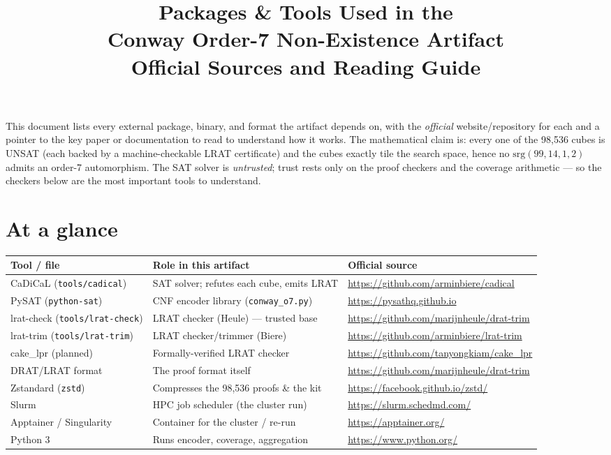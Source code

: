 \documentclass[11pt]{article}
\title{Packages \& Tools Used in the\\ Conway Order-7 Non-Existence Artifact\\[4pt]
\large Official Sources and Reading Guide}
\author{}
\date{}
\begin{document}
\maketitle

\noindent
This document lists every external package, binary, and format the artifact
depends on, with the \emph{official} website/repository for each and a pointer
to the key paper or documentation to read to understand how it works. The
mathematical claim is: every one of the 98{,}536 cubes is UNSAT (each backed by
a machine-checkable LRAT certificate) and the cubes exactly tile the search
space, hence no $\mathrm{srg}(99,14,1,2)$ admits an order-7 automorphism. The SAT
solver is \emph{untrusted}; trust rests only on the proof checkers and the
coverage arithmetic --- so the checkers below are the most important tools to
understand.

\section*{At a glance}
\noindent\begin{center}\small
\begin{tabular}{@{}p{} p{} p{}@{}}
\textbf{Tool / file} & \textbf{Role in this artifact} & \textbf{Official source} \\
\hline
CaDiCaL (\texttt{tools/cadical}) & SAT solver; refutes each cube, emits LRAT & \url{https://github.com/arminbiere/cadical} \\
PySAT (\texttt{python-sat}) & CNF encoder library (\texttt{conway\_o7.py}) & \url{https://pysathq.github.io} \\
lrat-check (\texttt{tools/lrat-check}) & LRAT checker (Heule) --- trusted base & \url{https://github.com/marijnheule/drat-trim} \\
lrat-trim (\texttt{tools/lrat-trim}) & LRAT checker/trimmer (Biere) & \url{https://github.com/arminbiere/lrat-trim} \\
cake\_lpr (planned) & Formally-verified LRAT checker & \url{https://github.com/tanyongkiam/cake_lpr} \\
DRAT/LRAT format & The proof format itself & \url{https://github.com/marijnheule/drat-trim} \\
Zstandard (\texttt{zstd}) & Compresses the 98{,}536 proofs \& the kit & \url{https://facebook.github.io/zstd/} \\
Slurm & HPC job scheduler (the cluster run) & \url{https://slurm.schedmd.com/} \\
Apptainer / Singularity & Container for the cluster / re-run & \url{https://apptainer.org/} \\
Python 3 & Runs encoder, coverage, aggregation & \url{https://www.python.org/} \\
\end{tabular}
\end{center}
\end{document}
